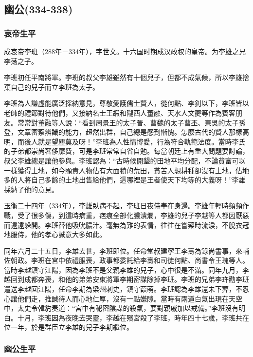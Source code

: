 
\subsection{幽公\tiny(334-338)}

\subsubsection{哀帝生平}

成哀帝李班（288年－334年），字世文。十六国时期成汉政权的皇帝。为李雄之兄李荡之子。

李班初任平南將軍。李班的叔父李雄雖然有十個兒子，但都不成氣候，所以李雄捨棄自己的兒子而立李班為太子。

李班為人謙虛能廣泛採納意見，尊敬愛護儒士賢人，從何點、李釗以下，李班皆以老師的禮節對待他們，又接納名士王嘏和隴西人董融、天水人文夔等作為賓客朋友。常常對董融等人說：“看到周景王的太子晉、曹魏的太子曹丕、東吳的太子孫登，文章審察辨識的能力，超然出群，自己總是感到慚愧。怎麼古代的賢人那樣高明，而後人就是望塵莫及呀！”李班為人性情博愛，行為符合軌範法度。當時李氏的子弟都崇尚奢侈靡費，可是李班常常自省自勉。每當朝廷上有重大問題要討論，叔父李雄總是讓他參與。李班認為：“古時候開墾的田地平均分配，不論貧富可以一樣獲得土地，如今顯貴人物佔有大面積的荒田，貧苦人想耕種卻沒有土地，佔地多的人將自己多餘的土地出售給他們，這哪裡是王者使天下均等的大義呀！”李雄採納了他的意見。

玉衡二十四年（334年），李雄臥病不起，李班日夜侍奉在身邊。李雄年輕時頻頻作戰，受了很多傷，到這時病重，疤痕全部化膿潰爛，李雄的兒子李越等人都因厭惡而遠遠躲開。李班替他吸吮膿汁。毫無為難的表情，往往在嘗藥時流淚，不脫衣冠地服侍，他的孝心誠意大多如此。

同年六月二十五日，李雄去世，李班即位。任命堂叔建寧王李壽為錄尚書事，來輔佐朝政。李班在宮中依禮服喪，政事都委託給李壽和司徒何點、尚書令王瑰等人。當時李越鎮守江陽，因為李班不是父親李雄的兒子，心中很是不滿。同年九月，李越回到成都奔喪，和他的弟弟安東將軍李期密謀除掉李班。李班的兄弟李玝勸李班遣送李越回江陽，任命李期為梁州刺史，鎮守葭萌。李班認為李雄還未下葬，不忍心讓他們走，推誠待人而心地仁厚，沒有一點嫌隙。當時有兩道白氣出現在天空中，太史令韓豹奏道：“宮中有秘密陰謀的殺氣，要對親戚加以戒備。”李班沒有明白。十月，李班因為夜晚去哭靈，李越在殯宮殺了李班，時年四十七歲，李班共在位一年，於是群臣立李雄的兒子李期繼位。

\subsubsection{幽公生平}

